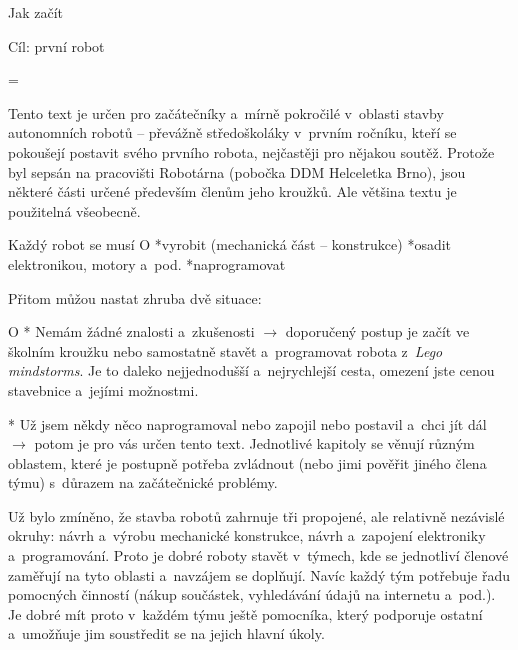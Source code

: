  \chap Jak začít 
 
 \sec Cíl: první robot

\parskip=\smallskipamount %
\parindent=0pt %
\let\itemskip=\relax %

Tento text je určen pro začátečníky a~mírně pokročilé v~oblasti stavby autonomních robotů -- převážně středoškoláky v~prvním ročníku, kteří se pokoušejí postavit 
svého prvního \Black  robota, nejčastěji pro nějakou soutěž. Protože byl sepsán na pracovišti Robotárna (pobočka DDM Helceletka Brno), jsou některé části určené především členům jeho kroužků. Ale většina textu je použitelná všeobecně.   

Každý robot se musí 
\begitems \style O
*vyrobit (mechanická část -- konstrukce)
*osadit elektronikou, motory a~pod. 
*naprogramovat 
\enditems

Přitom můžou nastat zhruba dvě situace: 

\begitems \style O
* Nemám žádné znalosti a~zkušenosti $\rightarrow$ doporučený postup je začít ve školním kroužku 
nebo samostatně stavět a~programovat robota z~{\it Lego mindstorms}. 
Je to daleko nejjednodušší a~nejrychlejší cesta, omezení jste cenou stavebnice a~jejími možnostmi. 

* Už jsem někdy něco naprogramoval nebo zapojil nebo postavil a~chci jít dál $\rightarrow$ potom je pro vás určen tento text. Jednotlivé kapitoly se věnují různým oblastem, které je postupně potřeba zvládnout (nebo jimi pověřit jiného člena týmu) s~důrazem na začátečnické problémy. 
\enditems


Už bylo zmíněno, že stavba robotů zahrnuje tři propojené, ale relativně nezávislé okruhy: návrh a~výrobu mechanické konstrukce, návrh a~zapojení elektroniky a~programování. 
Proto je dobré roboty stavět v~týmech, kde se jednotliví členové zaměřují na tyto oblasti a~navzájem se doplňují. Navíc každý tým potřebuje řadu pomocných činností (nákup součástek, vyhledávání údajů na internetu a~pod.). Je dobré mít proto v~každém týmu ještě pomocníka, který podporuje ostatní a~umožňuje jim soustředit se na jejich hlavní úkoly. 

